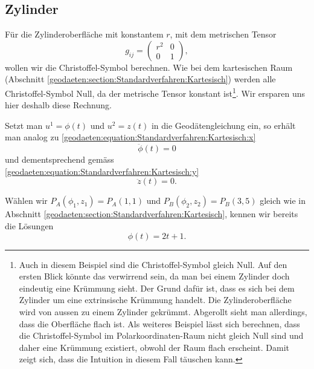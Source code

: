 %
%
%
%
\subsection{Zylinder\label{geodaeten:section:Standardverfahren:Zylinder}}

Für die Zylinderoberfläche mit konstantem $r$, mit dem metrischen Tensor 
\begin{equation}
	g_{ij} = \begin{pmatrix} 
		r^2 & 0 \\ 
		0 & 1 
	\end{pmatrix},
\end{equation}
wollen wir die Christoffel-Symbol berechnen. 
Wie bei dem kartesischen Raum (Abschnitt \ref{geodaeten:section:Standardverfahren:Kartesisch}) werden alle Christoffel-Symbol Null, da der metrische Tensor konstant ist\footnote{
Auch in diesem Beispiel sind die Christoffel-Symbol gleich Null.
Auf den ersten Blick könnte das verwirrend sein, da man bei einem Zylinder doch eindeutig eine Krümmung sieht.
Der Grund dafür ist, dass es sich bei dem Zylinder um eine extrinsische Krümmung handelt.
Die Zylinderoberfläche wird von aussen zu einem Zylinder gekrümmt.
Abgerollt sieht man allerdings, dass die Oberfläche flach ist.
Als weiteres Beispiel lässt sich berechnen, dass die Christoffel-Symbol im Polarkoordinaten-Raum nicht gleich Null sind und daher eine Krümmung existiert, obwohl der Raum flach erscheint.
Damit zeigt sich, dass die Intuition in diesem Fall täuschen kann.
}.
Wir ersparen uns hier deshalb diese Rechnung.

Setzt man $u^1 = \phi (t)$ und $u^2 = z(t)$ in die Geodätengleichung ein, so erhält man analog zu \eqref{geodaeten:equation:Standardverfahren:Kartesisch:x}
\begin{equation}
	\ddot{\phi}(t) = 0
	\label{geodaeten:equation:Standardverfahren:Zylinder:phi}
\end{equation}
und dementsprechend gemäss \eqref{geodaeten:equation:Standardverfahren:Kartesisch:y}
\begin{equation}
	\ddot{z}(t) = 0 .
\end{equation}

Wählen wir  $P_A(\phi_1 , z_1) = P_A(1 , 1)$ und $P_B(\phi_2 , z_2) = P_B(3 , 5)$ gleich wie in Abschnitt \ref{geodaeten:section:Standardverfahren:Kartesisch}, kennen wir bereits die Lösungen
\begin{equation}
	\phi(t) = 2t + 1 .
\end{equation}

